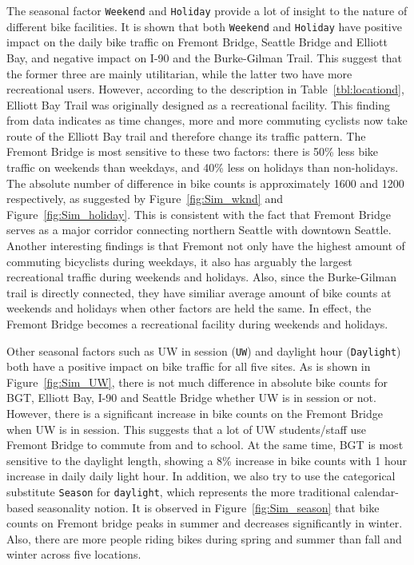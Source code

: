 \documentclass [11pt, proquest] {uwthesis}[2015/03/03]
\begin{document}
The seasonal factor \texttt{Weekend} and \texttt{Holiday} provide a lot of insight to the nature of different bike facilities. It is shown that both \texttt{Weekend} and \texttt{Holiday} have positive impact on the daily bike traffic on Fremont Bridge, Seattle Bridge and Elliott Bay, and negative impact on I-90 and the Burke-Gilman Trail. This suggest that the former three are mainly utilitarian, while the latter two have more recreational users. However, according to the description in Table~\ref{tbl:locationd}, Elliott Bay Trail was originally designed as a recreational facility. This finding from data indicates as time changes, more and more commuting cyclists now take route of the Elliott Bay trail and therefore change its traffic pattern. The Fremont Bridge is most sensitive to these two factors: there is 50\% less bike traffic on weekends than weekdays, and 40\% less on holidays than non-holidays. The absolute number of difference in bike counts is approximately 1600 and 1200 respectively, as suggested by Figure~\ref{fig:Sim_wknd} and Figure~\ref{fig:Sim_holiday}. This is consistent with the fact that Fremont Bridge serves as a major corridor connecting northern Seattle with downtown Seattle. Another interesting findings is that Fremont not only have the highest amount of commuting bicyclists during weekdays, it also has arguably the largest recreational traffic during weekends and holidays. Also, since the Burke-Gilman trail is directly connected, they have similiar average amount of bike counts at weekends and holidays when other factors are held the same. In effect, the Fremont Bridge becomes a recreational facility during weekends and holidays. 

Other seasonal factors such as UW in session (\texttt{UW}) and daylight hour (\texttt{Daylight}) both have a positive impact on bike traffic for all five sites. As is shown in Figure~\ref{fig:Sim_UW}, there is not much difference in absolute bike counts for BGT, Elliott Bay, I-90 and Seattle Bridge whether UW is in session or not. However, there is a significant increase in bike counts on the Fremont Bridge when UW is in session. This suggests that a lot of UW students/staff use Fremont Bridge to commute from and to school. At the same time, BGT is most sensitive to the daylight length, showing a 8\% increase in bike counts with 1 hour increase in daily daily light hour. In addition, we also try to use the categorical substitute \texttt{Season} for \texttt{daylight}, which represents the more traditional calendar-based seasonality notion. It is observed in Figure~\ref{fig:Sim_season} that bike counts on Fremont bridge peaks in summer and decreases significantly in winter. Also, there are more people riding bikes during spring and summer than fall and winter across five locations. 
\end{document}
